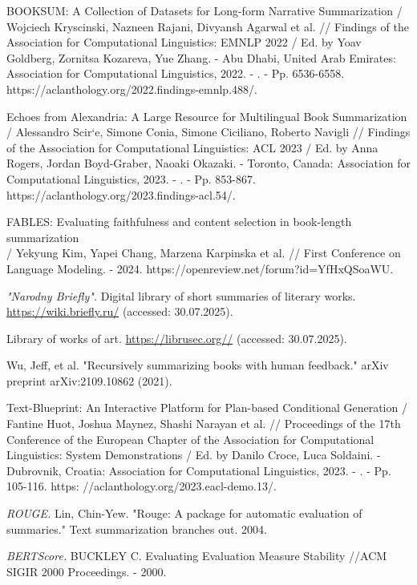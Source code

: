 \documentclass{superfri}
\begin{document}

\begin{thebibliography}{99}
BOOKSUM: A Collection of Datasets for Long-form Narrative Summarization / Wojciech Kryscinski, Nazneen Rajani, Divyansh Agarwal et al. // Findings of the Association for Computational Linguistics: EMNLP 2022 / Ed. by Yoav Goldberg, Zornitsa Kozareva, Yue Zhang. - Abu Dhabi, United Arab Emirates: Association for Computational Linguistics, 2022. - . - Pp. 6536-6558. https://aclanthology.org/2022.findings-emnlp.488/.

Echoes from Alexandria: A Large Resource for Multilingual Book Summarization / Alessandro Scir`e, Simone Conia, Simone Ciciliano, Roberto Navigli // Findings of the Association for Computational Linguistics: ACL 2023 / Ed. by Anna Rogers, Jordan Boyd-Graber, Naoaki Okazaki. - Toronto, Canada: Association for Computational Linguistics, 2023. - . - Pp. 853-867. https://aclanthology.org/2023.findings-acl.54/.

FABLES: Evaluating faithfulness and content selection in book-length summarization \\/ Yekyung Kim, Yapei Chang, Marzena Karpinska et al. // First Conference on Language Modeling. - 2024. https://openreview.net/forum?id=YfHxQSoaWU.

\textit{"Narodny Briefly".}  
Digital library of short summaries of literary works.
\url{https://wiki.briefly.ru/} (accessed: 30.07.2025).

Library of works of art.
\url{https://librusec.org//} (accessed: 30.07.2025).

Wu, Jeff, et al. "Recursively summarizing books with human feedback." arXiv preprint arXiv:2109.10862 (2021).

Text-Blueprint: An Interactive Platform for Plan-based Conditional Generation / Fantine Huot, Joshua Maynez, Shashi Narayan et al. // Proceedings of the 17th Conference of the European Chapter of the Association for Computational Linguistics:
System Demonstrations / Ed. by Danilo Croce, Luca Soldaini. - Dubrovnik, Croatia: Association for Computational Linguistics, 2023. - . - Pp. 105-116. https:
//aclanthology.org/2023.eacl-demo.13/.

\textit{ROUGE.}
Lin, Chin-Yew. "Rouge: A package for automatic evaluation of summaries." Text summarization branches out. 2004.

\textit{BERTScore.}
BUCKLEY C. Evaluating Evaluation Measure Stability //ACM SIGIR 2000 Proceedings. - 2000.


\end{thebibliography}
\end{document}
